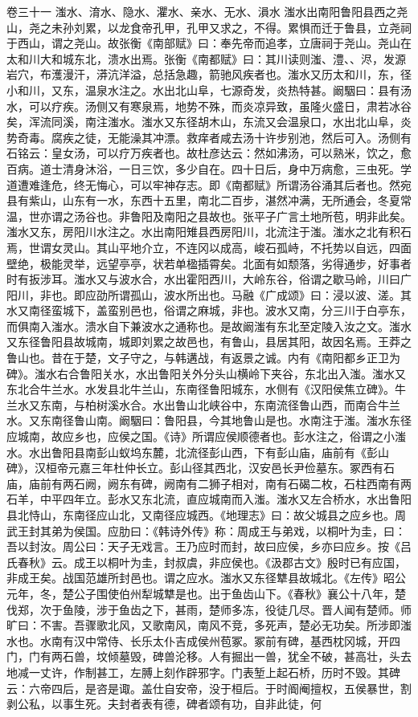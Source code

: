 \documentclass[12pt,UTF8]{ctexbook}
\begin{document}
卷三十一  滍水、淯水、隐水、灈水、亲水、无水、溳水 
滍水出南阳鲁阳县西之尧山，尧之未孙刘累，以龙食帝孔甲，孔甲又求之，不得。累惧而迁于鲁县，立尧祠于西山，谓之尧山。故张衡《南部赋》曰：奉先帝而追孝，立唐祠于尧山。尧山在太和川大和城东北，溃水出焉。张衡《南都赋》曰：其川读则滍、澧、、浕，发源岩穴，布濩漫汗，漭沆洋溢，总括急趣，箭驰风疾者也。滍水又历太和川，东，径小和川，又东，温泉水注之。水出北山阜，七源奇发，炎热特甚。阚駰曰：县有汤水，可以疗疾。汤侧又有寒泉焉，地势不殊，而炎凉异致，虽隆火盛日，肃若冰谷矣，浑流同溪，南注滍水。滍水又东径胡木山，东流又会温泉口，水出北山阜，炎势奇毒。腐疾之徒，无能澡其冲漂。救痒者咸去汤十许步别池，然后可入。汤侧有石铭云：皇女汤，可以疗万疾者也。故杜彦达云：然如沸汤，可以熟米，饮之，愈百病。道士清身沐浴，一日三饮，多少自在。四十日后，身中万病愈，三虫死。学道遭难逢危，终无悔心，可以牢神存志。即《南都赋》所谓汤谷涌其后者也。然宛县有紫山，山东有一水，东西十五里，南北二百步，湛然冲满，无所通会，冬夏常温，世亦谓之汤谷也。非鲁阳及南阳之县故也。张平子广言土地所苞，明非此矣。滍水又东，房阳川水注之。水出南阳雉县西房阳川，北流注于滍。滍水之北有积石焉，世谓女灵山。其山平地介立，不连冈以成高，峻石孤峙，不托势以自远，四面壁绝，极能灵举，远望亭亭，状若单楹插霄矣。北面有如颓落，劣得通步，好事者时有扳涉耳。滍水又与波水合，水出霍阳西川，大岭东谷，俗谓之歇马岭，川曰广阳川，非也。即应劭所谓孤山，波水所出也。马融《广成颂》曰：浸以波、溠。其水又南径蛮城下，盖蛮别邑也，俗谓之麻城，非也。波水又南，分三川于白亭东，而俱南入滍水。溃水自下兼波水之通称也。是故阚滍有东北至定陵入汝之文。滍水又东径鲁阳县故城南，城即刘累之故邑也，有鲁山，县居其阳，故因名焉。王莽之鲁山也。昔在于楚，文子守之，与韩遘战，有返景之诚。内有《南阳都乡正卫为碑》。滍水右合鲁阳关水，水出鲁阳关外分头山横岭下夹谷，东北出入滍。滍水又东北合牛兰水。水发县北牛兰山，东南径鲁阳城东，水侧有《汉阳侯焦立碑》。牛兰水又东南，与柏树溪水合。水出鲁山北峡谷中，东南流径鲁山西，而南合牛兰水。又东南径鲁山南。阚駰曰：鲁阳县，今其地鲁山是也。水南注于滍。滍水东径应城南，故应乡也，应侯之国。《诗》所谓应侯顺德者也。彭水注之，俗谓之小滍水。水出鲁阳县南彭山蚁坞东麓，北流径彭山西，下有彭山庙，庙前有《彭山碑》，汉桓帝元嘉三年杜仲长立。彭山径其西北，汉安邑长尹俭墓东。冢西有石庙，庙前有两石阙，阙东有碑，阙南有二狮子相对，南有石碣二枚，石柱西南有两石羊，中平四年立。彭水又东北流，直应城南而入滍。滍水又左合桥水，水出鲁阳县北恃山，东南径应山北，又南径应城西。《地理志》曰：故父城县之应乡也。周武王封其弟为侯国。应肋曰：《韩诗外传》称：周成王与弟戏，以桐叶为圭，曰：吾以封汝。周公曰：天子无戏言。王乃应时而封，故曰应侯，乡亦曰应乡。按《吕氏春秋》云。成王以桐叶为圭，封叔虞，非应侯也。《汲郡古文》殷时已有应国，非成王矣。战国范雄所封邑也。谓之应水。滍水又东径犨县故城北。《左传》昭公元年，冬，楚公子围使伯州犁城犨是也。出于鱼齿山下。《春秋》襄公十八年，楚伐郑，次于鱼陵，涉于鱼齿之下，甚雨，楚师多冻，役徒几尽。晋人闻有楚师。师旷曰：不害。吾骤歌北风，又歌南风，南风不竞，多死声，楚必无功矣。所涉即滍水也。水南有汉中常侍、长乐太仆吉成侯州苞冢。冢前有碑，基西枕冈城，开四门，门有两石兽，坟倾墓毁，碑兽沦移。人有掘出一兽，犹全不破，甚高壮，头去地减一丈许，作制甚工，左膊上刻作辟邪字。门表堑上起石桥，历时不毁。其碑云：六帝四后，是咨是诹。盖仕自安帝，没于桓后。于时阍阉擅权，五侯暴世，割剥公私，以事生死。夫封者表有德，碑者颂有功，自非此徒，何
\end{document}
